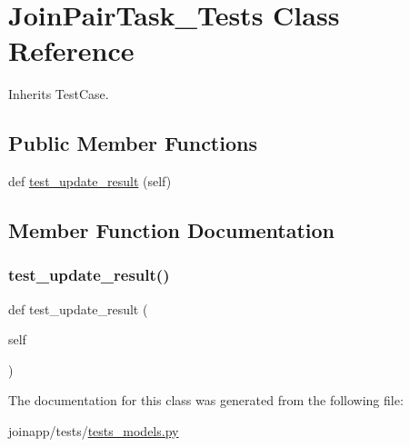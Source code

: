 \hypertarget{classtests__models_1_1_join_pair_task___tests}{}\section{Join\+Pair\+Task\+\_\+\+Tests Class Reference}
\label{classtests__models_1_1_join_pair_task___tests}


Inherits Test\+Case.

\subsection*{Public Member Functions}
\begin{DoxyCompactItemize}
\item 
def \mbox{\hyperlink{classtests__models_1_1_join_pair_task___tests_a1466bd141ad5f6473d022ba00c25dfdb}{test\+\_\+update\+\_\+result}} (self)
\end{DoxyCompactItemize}


\subsection{Member Function Documentation}
\mbox{\label{classtests__models_1_1_join_pair_task___tests_a1466bd141ad5f6473d022ba00c25dfdb}} 
\subsubsection{\texorpdfstring{test\_update\_result()}{test\_update\_result()}}
{\footnotesize\ttfamily def test\+\_\+update\+\_\+result (\begin{DoxyParamCaption}\item[{}]{self }\end{DoxyParamCaption})}



The documentation for this class was generated from the following file\+:\begin{DoxyCompactItemize}
\item 
joinapp/tests/\mbox{\hyperlink{tests__models_8py}{tests\+\_\+models.\+py}}\end{DoxyCompactItemize}
